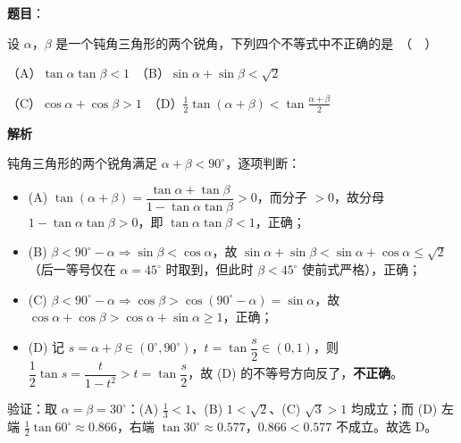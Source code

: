 \begin{answer}

\textbf{题目}：

设 $\alpha$，$\beta$ 是一个钝角三角形的两个锐角，下列四个不等式中不正确的是　（　）

（A）$\tan\alpha\tan\beta < 1$　（B）$\sin\alpha + \sin\beta < \sqrt{2}$

（C）$\cos\alpha + \cos\beta > 1$　（D）$\frac{1}{2}\tan(\alpha+\beta) < \tan\frac{\alpha+\beta}{2}$

\textbf{解析}

钝角三角形的两个锐角满足 $\alpha+\beta<90^\circ$，逐项判断：

\begin{itemize}
\item (A) $\tan(\alpha+\beta)=\dfrac{\tan\alpha+\tan\beta}{1-\tan\alpha\tan\beta}>0$，而分子 $>0$，故分母 $1-\tan\alpha\tan\beta>0$，即 $\tan\alpha\tan\beta<1$，正确；
\item (B) $\beta<90^\circ-\alpha\Rightarrow\sin\beta<\cos\alpha$，故 $\sin\alpha+\sin\beta<\sin\alpha+\cos\alpha\le\sqrt2$（后一等号仅在 $\alpha=45^\circ$ 时取到，但此时 $\beta<45^\circ$ 使前式严格），正确；
\item (C) $\beta<90^\circ-\alpha\Rightarrow\cos\beta>\cos(90^\circ-\alpha)=\sin\alpha$，故 $\cos\alpha+\cos\beta>\cos\alpha+\sin\alpha\ge1$，正确；
\item (D) 记 $s=\alpha+\beta\in(0^\circ,90^\circ)$，$t=\tan\dfrac s2\in(0,1)$，则 $\dfrac12\tan s=\dfrac{t}{1-t^2}>t=\tan\dfrac s2$，故 (D) 的不等号方向反了，\textbf{不正确}。
\end{itemize}

验证：取 $\alpha=\beta=30^\circ$：(A) $\tfrac13<1$、(B) $1<\sqrt2$、(C) $\sqrt3>1$ 均成立；而 (D) 左端 $\tfrac12\tan60^\circ\approx0.866$，右端 $\tan30^\circ\approx0.577$，$0.866<0.577$ 不成立。故选 D。


\par\medskip

\end{answer}
